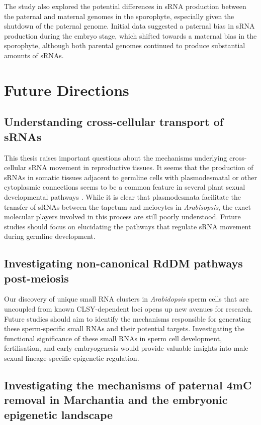 The study also explored the potential differences in sRNA production between the paternal and maternal genomes in the sporophyte, especially given the shutdown of the paternal genome. Initial data suggested a paternal bias in sRNA production during the embryo stage, which shifted towards a maternal bias in the sporophyte, although both parental genomes continued to produce substantial amounts of sRNAs.

\section{Future Directions}

\subsection{Understanding cross-cellular transport of sRNAs}

This thesis raises important questions about the mechanisms underlying cross-cellular sRNA movement in reproductive tissues. It seems that the production of sRNAs in somatic tissues adjacent to germline cells with plasmodesmatal or other cytoplasmic connections seems to be a common feature in several plant sexual developmental pathways \citep{RN187,RN293,RN57,RN235}. While it is clear that plasmodesmata facilitate the transfer of sRNAs between the tapetum and meiocytes in \textit{Arabisopsis}, the exact molecular players involved in this process are still poorly understood. Future studies should focus on elucidating the pathways that regulate sRNA movement during germline development.

\subsection{Investigating non-canonical RdDM pathways post-meiosis}

Our discovery of unique small RNA clusters in \textit{Arabidopsis} sperm cells that are uncoupled from known CLSY-dependent loci opens up new avenues for research. Future studies should aim to identify the mechanisms responsible for generating these sperm-specific small RNAs and their potential targets. Investigating the functional significance of these small RNAs in sperm cell development, fertilisation, and early embryogenesis would provide valuable insights into male sexual lineage-specific epigenetic regulation.

\subsection{Investigating the mechanisms of paternal 4mC removal in Marchantia and the embryonic epigenetic landscape}

